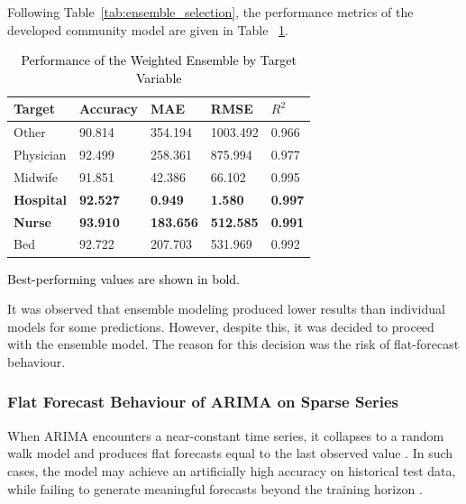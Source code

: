 \documentclass[final, 9pt, twocolumn]{saucis}
\newcommand{\rev}[1]{\textcolor{black}{#1}}
\begin{document}
Following Table~\ref{tab:ensemble_selection}, the performance metrics of the developed community model are given in Table ~\ref{tab:ensemble_metrics}.

\begin{table}[htbp]
\begin{threeparttable}
\centering
\caption{\rev{Performance of the Weighted Ensemble by Target Variable}}
\label{tab:ensemble_metrics}
\small
\begin{tabular}{p{1.2cm} p{1.2cm} p{1.2cm} p{1.2cm} p{1.2cm}}
\hline
\textbf{Target} & \textbf{Accuracy} & \textbf{MAE} & \textbf{RMSE} & \textbf{$R^{2}$} \\
\hline
Other    & 90.814 & 354.194 & 1003.492 & 0.966 \\
Physician   & 92.499 & 258.361 &  875.994 & 0.977 \\
Midwife  & 91.851 &  42.386 &   66.102 & 0.995 \\
\textbf{Hospital} & \textbf{92.527} &   \textbf{0.949} &    \textbf{1.580} & \textbf{0.997} \\
\textbf{Nurse}    & \textbf{93.910} & \textbf{183.656} &  \textbf{512.585} & \textbf{0.991} \\
Bed      & 92.722 & 207.703 &  531.969 & 0.992 \\
\hline
\end{tabular}
\begin{tablenotes}
\footnotesize
\item \rev{Best-performing values are shown in bold.}
\end{tablenotes}
\end{threeparttable}
\end{table}

It was observed that ensemble modeling produced lower results than individual models for some predictions. However, despite this, it was decided to proceed with the ensemble model. The reason for this decision was the risk of flat-forecast behaviour.

\subsubsection{Flat Forecast Behaviour of ARIMA on Sparse Series}
When ARIMA encounters a near-constant time series, it collapses 
to a random walk model and produces flat forecasts equal to the 
last observed value \cite{result1}. In such cases, the model 
may achieve an artificially high accuracy on historical test data, while failing to generate meaningful forecasts beyond the training horizon \cite{result2}.
\end{document}
